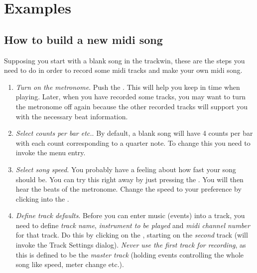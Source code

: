 \documentclass[letterpaper]{report}
\begin{document}

\chapter{Examples}\label{examples}

\section{How to build a new midi song}\label{exmidisong}

Supposing you start with a blank song in the trackwin, these are the steps
you need to do in order to record some midi tracks and make your own midi song.

\begin{enumerate}

\item {\em Turn on the metronome}. Push the .
This will help you keep in time when playing.
Later, when you have recorded some tracks, you may want to turn the metronome
off again because the other recorded tracks will support you with the necessary
beat information.

\item {\em Select counts per bar etc.}. By default, a blank song will have
4 counts per bar with each count corresponding to a quarter note. To change
this you need to invoke the 
menu entry.

\item {\em Select song speed}. You probably have a feeling about how fast
your song should be. You can try this right away by just pressing the
. You will then hear the beats of the
metronome. Change the speed to your preference by clicking into the
.

\item {\em Define track defaults}\label{rectrackdef}. Before you can enter music
(events) into
a track, you need to define {\em track name}, {\em instrument to be played}
and {\em midi channel number} for that track. Do this by clicking on the
, starting on the {\em second} track (will
invoke the Track Settings dialog). {\em Never use the first track for
recording}, as this is defined to be the {\em master track} (holding events
controlling the whole song like speed, meter change etc.).


\end{enumerate}
\end{document}
